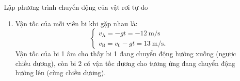 \begin{dang}{Lập phương trình chuyển động của vật rơi tự do}
{\begin{enumerate}[label=\alph*.]
			Khi đó hai viên bi đang ở tọa độ 
			\begin{equation*}
				y_{\text{A}}=y_{\text{B}}=30-5t^2=\SI{22.8}{\meter}.
			\end{equation*}
			\item  Vận tốc của mỗi viên bi khi gặp nhau là:
			\begin{equation*}
				\left\{\begin{array}{ll}{v_{\text{A}}=-gt=\SI{-12}{\meter/\second}}&\\{v_{\text{B}}=v_0-gt=\SI{13}{\meter/\second}.}&\end{array}\right.
			\end{equation*}
			Vận tốc của bi 1 âm cho thấy bi 1 đang chuyển động hướng xuống (ngược chiều dương), còn bi 2 có vận tốc dương cho tương ứng đang chuyển động hướng lên (cùng chiều dương).
		\end{enumerate}
	}
\end{dang}

